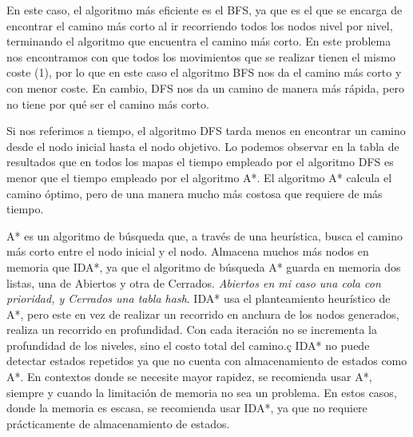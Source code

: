 \documentclass{article}
\begin{document}
\newline En este caso, el algoritmo más eficiente es el BFS, ya que es el que se encarga de encontrar el camino más corto 
al ir recorriendo todos los nodos nivel por nivel, terminando el algoritmo que encuentra el camino más corto.
En este problema nos encontramos con que todos los movimientos que se realizar tienen el mismo coste (1), por lo que 
en este caso el algoritmo BFS nos da el camino más corto y con menor coste.
En cambio, DFS nos da un camino de manera más rápida, pero no tiene por qué ser el camino más corto.

\vspace{5mm}
\newline Si nos referimos a tiempo, el algoritmo DFS tarda menos en encontrar un camino desde el nodo inicial hasta el nodo 
objetivo. Lo podemos observar en la tabla de resultados que en todos los mapas el tiempo empleado por el algoritmo DFS es menor 
que el tiempo empleado por el algoritmo A*.
El algoritmo A* calcula el camino óptimo, pero de una manera mucho más costosa que requiere de más tiempo.

\vspace{5mm}
\newline A* es un algoritmo de búsqueda que, a través de una heurística, busca el camino más corto entre el nodo inicial y el nodo.
Almacena muchos más nodos en memoria que IDA*, ya que el algoritmo de búsqueda A* guarda en memoria dos listas, una de Abiertos y otra 
de Cerrados. \emph{Abiertos en mi caso una cola con prioridad, y Cerrados una tabla hash}.
IDA* usa el planteamiento heurístico de A*, pero este en vez de realizar un recorrido en anchura de los nodos generados, realiza un recorrido 
en profundidad. Con cada iteración no se incrementa la profundidad de los niveles, sino el costo total del camino.ç
IDA* no puede detectar estados repetidos ya que no cuenta con almacenamiento de estados como A*.
En contextos donde se necesite mayor rapidez, se recomienda usar A*, siempre y cuando la limitación de memoria no sea 
un problema. En estos casos, donde la memoria es escasa, se recomienda usar IDA*, ya que no requiere prácticamente de almacenamiento 
de estados.
\end{document}
